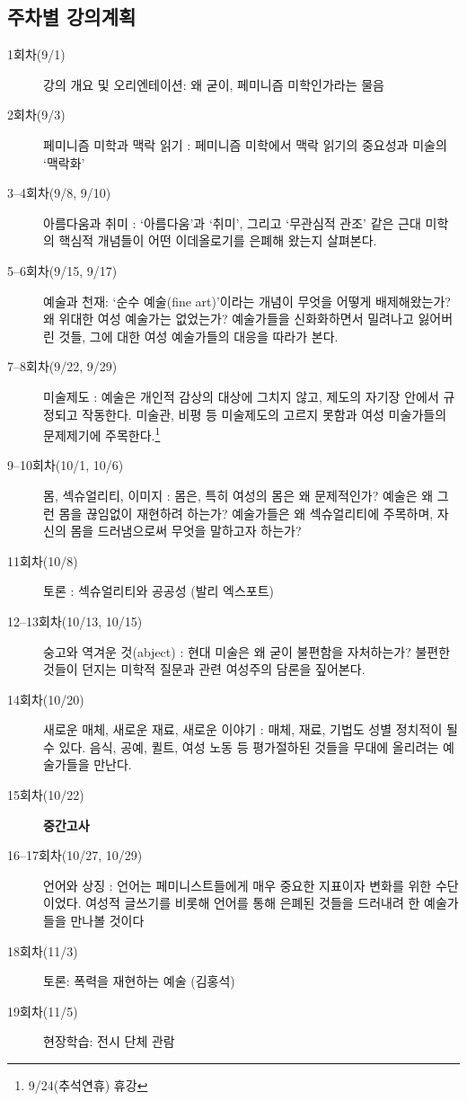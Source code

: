 \documentclass{article}
\begin{document}
\subsection{주차별 강의계획}
\medskip
\begin{description}
    \item[1회차(9/1)] 강의 개요 및 오리엔테이션: 왜 굳이, 페미니즘 미학인가라는 물음
    \item[2회차(9/3)] 페미니즘 미학과 맥락 읽기 : 페미니즘 미학에서 맥락 읽기의 중요성과 미술의 `맥락화'
    \item[3--4회차(9/8, 9/10)] 아름다움과 취미 : `아름다움'과 `취미', 그리고 `무관심적 관조' 같은 근대 미학의 핵심적 개념들이 어떤 이데올로기를 은폐해 왔는지 살펴본다.
    \item[5--6회차(9/15, 9/17)] 예술과 천재: `순수 예술(fine art)'이라는 개념이 무엇을 어떻게 배제해왔는가? 왜 위대한 여성 예술가는 없었는가? 예술가들을 신화화하면서 밀려나고 잃어버린 것들, 그에 대한 여성 예술가들의 대응을 따라가 본다.
    \item[7--8회차(9/22, 9/29)]  미술제도 : 예술은 개인적 감상의 대상에 그치지 않고, 제도의 자기장 안에서 규정되고 작동한다. 미술관, 비평 등 미술제도의 고르지 못함과 여성 미술가들의 문제제기에 주목한다.\footnote{9/24(추석연휴) 휴강}
    \item[9--10회차(10/1, 10/6)] 몸, 섹슈얼리티, 이미지 : 몸은, 특히 여성의 몸은 왜 문제적인가? 예술은 왜 그런 몸을 끊임없이 재현하려 하는가? 예술가들은 왜 섹슈얼리티에 주목하며, 자신의 몸을 드러냄으로써 무엇을 말하고자 하는가?
    \item[11회차(10/8)] 토론 : 섹슈얼리티와 공공성 (발리 엑스포트)
    \item[12--13회차(10/13, 10/15)] 숭고와 역겨운 것(abject) : 현대 미술은 왜 굳이 불편함을 자처하는가? 불편한 것들이 던지는 미학적 질문과 관련 여성주의 담론을 짚어본다.
    \item[14회차(10/20)] 새로운 매체, 새로운 재료, 새로운 이야기 : 매체, 재료, 기법도 성별 정치적이 될 수 있다. 음식, 공예, 퀼트, 여성 노동 등 평가절하된 것들을 무대에 올리려는 예술가들을 만난다.
    \item[15회차(10/22)] \textbf{중간고사}
    \newpage
    \item[16--17회차(10/27, 10/29)] 언어와 상징 : 언어는 페미니스트들에게 매우 중요한 지표이자 변화를 위한 수단이었다. 여성적 글쓰기를 비롯해 언어를 통해 은폐된 것들을 드러내려 한 예술가들을 만나볼 것이다
    \item[18회차(11/3)] 토론: 폭력을 재현하는 예술 (김홍석)
    \item[19회차(11/5)] 현장학습: 전시 단체 관람

\end{description}
\end{document}

